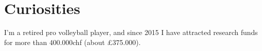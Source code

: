 \documentclass[]{plushcv}
\begin{document}
\begin{minipage}[t]{0.25\textwidth}

\section{Curiosities}
I'm a retired pro volleyball player, and since 2015 I have attracted research funds for more than 400.000chf (about £375.000).






\end{minipage} 
\end{document}

